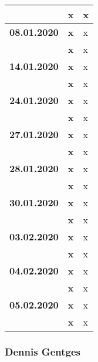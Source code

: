 {\begin{longtable}{|l|l|p{11cm}|}
			& \textbf{\hfill x} & x
		\\ \hline \textbf{08.01.2020}
			& \textbf{\hfill x} & x \\\cline{2-3}
			& \textbf{\hfill x} & x
		\\ \hline \textbf{14.01.2020}
			& \textbf{\hfill x} & x \\\cline{2-3}
			& \textbf{\hfill x} & x
		\\ \hline \textbf{24.01.2020}
			& \textbf{\hfill x} & x \\\cline{2-3}
			& \textbf{\hfill x} & x
		\\ \hline \textbf{27.01.2020}
			& \textbf{\hfill x} & x \\\cline{2-3}
			& \textbf{\hfill x} & x
		\\ \hline \textbf{28.01.2020}
			& \textbf{\hfill x} & x \\\cline{2-3}
			& \textbf{\hfill x} & x
		\\ \hline \textbf{30.01.2020}
			& \textbf{\hfill x} & x \\\cline{2-3}
			& \textbf{\hfill x} & x
		\\ \hline \textbf{03.02.2020}
			& \textbf{\hfill x} & x \\\cline{2-3}
			& \textbf{\hfill x} & x
		\\ \hline \textbf{04.02.2020}
			& \textbf{\hfill x} & x \\\cline{2-3}
			& \textbf{\hfill x} & x
		\\ \hline \textbf{05.02.2020}
			& \textbf{\hfill x} & x \\\cline{2-3}
			& \textbf{\hfill x} & x	\\
		\hline\hline
	\end{longtable}
}

\clearpage

\subsubsection{Dennis Gentges}

